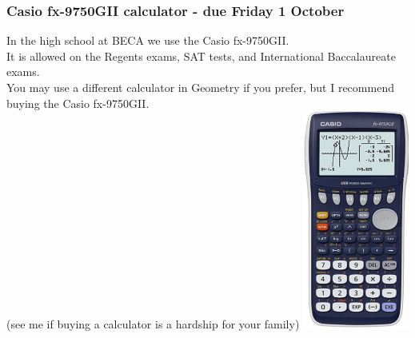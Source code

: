 \frame
{
  \frametitle{Casio fx-9750GII calculator - due Friday 1 October}
  \begin{multicols}{2}
  In the high school at BECA we use the Casio fx-9750GII.\\[5pt] 
  It is allowed on the Regents exams, SAT tests, and International Baccalaureate exams.\\[5pt]
  You may use a different calculator in Geometry if you prefer, but I recommend buying the Casio fx-9750GII.\\[5pt]
  (see me if buying a calculator is a hardship for your family)
  \includegraphics[width=3.5cm]{casio_fx-9750GII.png}
  \end{multicols}
}

